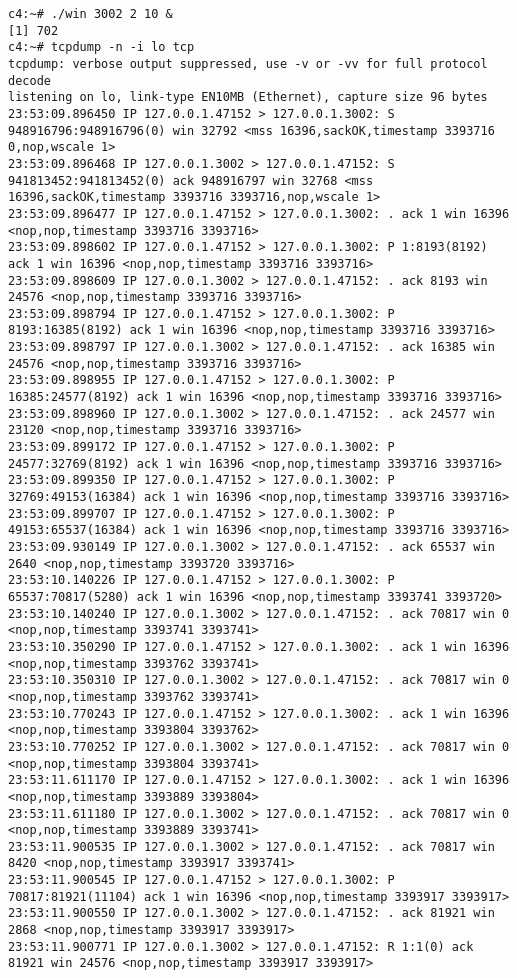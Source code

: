 \documentclass[a4paper,12pt]{article}
\begin{document}
\begin{Verbatim}
c4:~# ./win 3002 2 10 &
[1] 702
c4:~# tcpdump -n -i lo tcp
tcpdump: verbose output suppressed, use -v or -vv for full protocol decode
listening on lo, link-type EN10MB (Ethernet), capture size 96 bytes
23:53:09.896450 IP 127.0.0.1.47152 > 127.0.0.1.3002: S 948916796:948916796(0) win 32792 <mss 16396,sackOK,timestamp 3393716 0,nop,wscale 1>
23:53:09.896468 IP 127.0.0.1.3002 > 127.0.0.1.47152: S 941813452:941813452(0) ack 948916797 win 32768 <mss 16396,sackOK,timestamp 3393716 3393716,nop,wscale 1>
23:53:09.896477 IP 127.0.0.1.47152 > 127.0.0.1.3002: . ack 1 win 16396 <nop,nop,timestamp 3393716 3393716>
23:53:09.898602 IP 127.0.0.1.47152 > 127.0.0.1.3002: P 1:8193(8192) ack 1 win 16396 <nop,nop,timestamp 3393716 3393716>
23:53:09.898609 IP 127.0.0.1.3002 > 127.0.0.1.47152: . ack 8193 win 24576 <nop,nop,timestamp 3393716 3393716>
23:53:09.898794 IP 127.0.0.1.47152 > 127.0.0.1.3002: P 8193:16385(8192) ack 1 win 16396 <nop,nop,timestamp 3393716 3393716>
23:53:09.898797 IP 127.0.0.1.3002 > 127.0.0.1.47152: . ack 16385 win 24576 <nop,nop,timestamp 3393716 3393716>
23:53:09.898955 IP 127.0.0.1.47152 > 127.0.0.1.3002: P 16385:24577(8192) ack 1 win 16396 <nop,nop,timestamp 3393716 3393716>
23:53:09.898960 IP 127.0.0.1.3002 > 127.0.0.1.47152: . ack 24577 win 23120 <nop,nop,timestamp 3393716 3393716>
23:53:09.899172 IP 127.0.0.1.47152 > 127.0.0.1.3002: P 24577:32769(8192) ack 1 win 16396 <nop,nop,timestamp 3393716 3393716>
23:53:09.899350 IP 127.0.0.1.47152 > 127.0.0.1.3002: P 32769:49153(16384) ack 1 win 16396 <nop,nop,timestamp 3393716 3393716>
23:53:09.899707 IP 127.0.0.1.47152 > 127.0.0.1.3002: P 49153:65537(16384) ack 1 win 16396 <nop,nop,timestamp 3393716 3393716>
23:53:09.930149 IP 127.0.0.1.3002 > 127.0.0.1.47152: . ack 65537 win 2640 <nop,nop,timestamp 3393720 3393716>
23:53:10.140226 IP 127.0.0.1.47152 > 127.0.0.1.3002: P 65537:70817(5280) ack 1 win 16396 <nop,nop,timestamp 3393741 3393720>
23:53:10.140240 IP 127.0.0.1.3002 > 127.0.0.1.47152: . ack 70817 win 0 <nop,nop,timestamp 3393741 3393741>
23:53:10.350290 IP 127.0.0.1.47152 > 127.0.0.1.3002: . ack 1 win 16396 <nop,nop,timestamp 3393762 3393741>
23:53:10.350310 IP 127.0.0.1.3002 > 127.0.0.1.47152: . ack 70817 win 0 <nop,nop,timestamp 3393762 3393741>
23:53:10.770243 IP 127.0.0.1.47152 > 127.0.0.1.3002: . ack 1 win 16396 <nop,nop,timestamp 3393804 3393762>
23:53:10.770252 IP 127.0.0.1.3002 > 127.0.0.1.47152: . ack 70817 win 0 <nop,nop,timestamp 3393804 3393741>
23:53:11.611170 IP 127.0.0.1.47152 > 127.0.0.1.3002: . ack 1 win 16396 <nop,nop,timestamp 3393889 3393804>
23:53:11.611180 IP 127.0.0.1.3002 > 127.0.0.1.47152: . ack 70817 win 0 <nop,nop,timestamp 3393889 3393741>
23:53:11.900535 IP 127.0.0.1.3002 > 127.0.0.1.47152: . ack 70817 win 8420 <nop,nop,timestamp 3393917 3393741>
23:53:11.900545 IP 127.0.0.1.47152 > 127.0.0.1.3002: P 70817:81921(11104) ack 1 win 16396 <nop,nop,timestamp 3393917 3393917>
23:53:11.900550 IP 127.0.0.1.3002 > 127.0.0.1.47152: . ack 81921 win 2868 <nop,nop,timestamp 3393917 3393917>
23:53:11.900771 IP 127.0.0.1.3002 > 127.0.0.1.47152: R 1:1(0) ack 81921 win 24576 <nop,nop,timestamp 3393917 3393917>
\end{Verbatim}
\end{document}
